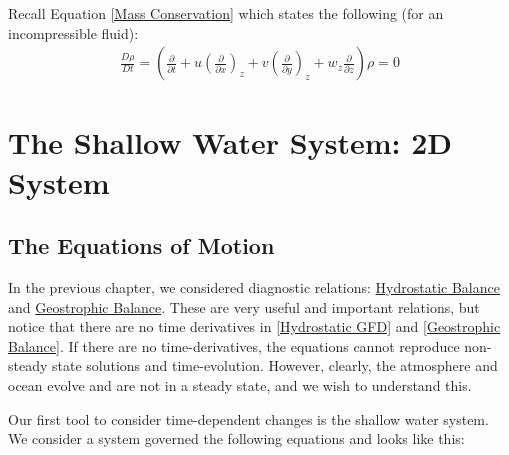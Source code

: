 Recall Equation \ref{Mass Conservation} which states the following (for an incompressible fluid):
\begin{align*}
    \frac{D\rho}{Dt}=\left( \frac{\partial }{\partial t} + u\left( \frac{\partial}{\partial x} \right)_{z}+v\left( \frac{\partial}{\partial y} \right)_{z}+w_z \frac{\partial}{\partial z}\right)\rho = 0
\end{align*}





\chapter{The Shallow Water System: 2D System}\label{Shallow Water System}

\section{The Equations of Motion}

In the previous chapter, we considered diagnostic relations: \hyperref[Hydrostatic GFD Box]{Hydrostatic Balance} and \hyperref[Geostrophic Box]{Geostrophic Balance}. These are very useful and important relations, but notice that there are no time derivatives in \ref{Hydrostatic GFD} and \ref{Geostrophic Balance}. If there are no time-derivatives, the equations cannot reproduce non-steady state solutions and time-evolution. However, clearly, the atmosphere and ocean evolve and are not in a steady state, and we wish to understand this.

Our first tool to consider time-dependent changes is the shallow water system. We consider a system governed the following equations and looks like this:

